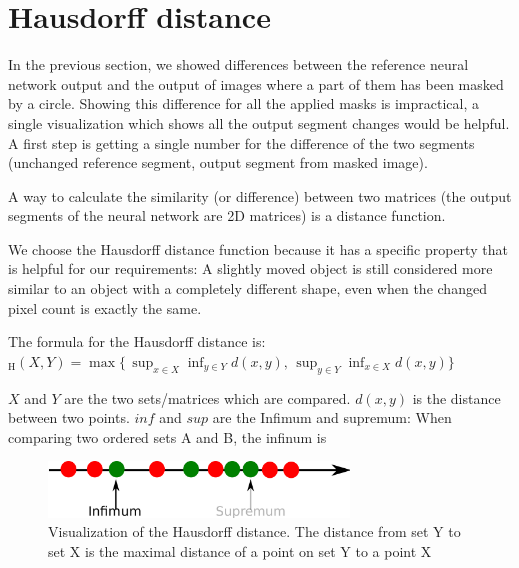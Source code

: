 \section{Hausdorff distance}
\label{hausdorff_distance_chapter}

In the previous section, we showed differences between the reference neural network output and the output of images where a part of them has been masked by a circle.
Showing this difference for all the applied masks is impractical, a single visualization which shows all the output segment changes would be helpful.
A first step is getting a single number for the difference of the two segments (unchanged reference segment, output segment from masked image).

A way to calculate the similarity (or difference) between two matrices (the output segments of the neural network are 2D matrices) is a distance function.

We choose the Hausdorff distance function because it has a specific property that is helpful for our requirements: A slightly moved object is still considered more similar to
an object with a completely different shape, even when the changed pixel count is exactly the same.

The formula for the Hausdorff distance is:
$ _{\mathrm {H} }(X,Y)=\max\{\,\sup _{x\in X}\inf _{y\in Y}d(x,y),\,\sup _{y\in Y}\inf _{x\in X}d(x,y)\} $

$X$ and $Y$ are the two sets/matrices which are compared. $d(x,y)$ is the distance between two points. $inf$ and $sup$ are the Infimum and supremum: When comparing two
ordered sets A and B, the infinum is 

\begin{figure}[H]
\centering
\includegraphics[width=8cm]{chapters/06_hdm/images/inf_sup.png}
\caption{Visualization of the Hausdorff distance. The distance from set Y to set X is the maximal distance of a point on set Y to a point X \cite{hausdorffdistanceimage2}}
\label{inf_sup}
\end{figure}

